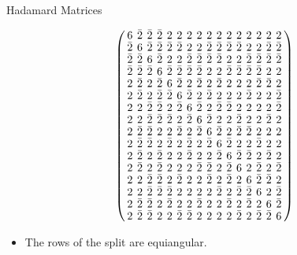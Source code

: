 \documentclass{beamer}
\begin{document}
\begin{frame}{Hadamard Matrices}

  \[
    \arraycolsep=2.0pt\def\arraystretch{0.75}
    \left(
      \begin{array}{cccccccccccccccc}
        6&\bar{2}&\bar{2}&\bar{2}&2&2&2&2&2&2&2&2&2&2&2&2\\
        \bar{2}&6&\bar{2}&\bar{2}&\bar{2}&\bar{2}&2&2&\bar{2}&\bar{2}&\bar{2}&\bar{2}&2&2&\bar{2}&\bar{2}\\
        \bar{2}&\bar{2}&6&\bar{2}&2&2&\bar{2}&\bar{2}&\bar{2}&\bar{2}&2&2&\bar{2}&\bar{2}&\bar{2}&\bar{2}\\
        \bar{2}&\bar{2}&\bar{2}&6&\bar{2}&\bar{2}&\bar{2}&\bar{2}&2&2&\bar{2}&\bar{2}&\bar{2}&\bar{2}&2&2\\
        2&\bar{2}&2&\bar{2}&6&\bar{2}&2&\bar{2}&2&\bar{2}&2&2&2&\bar{2}&\bar{2}&2\\
        2&\bar{2}&2&\bar{2}&\bar{2}&6&\bar{2}&2&\bar{2}&2&2&2&\bar{2}&2&2&\bar{2}\\
        2&2&\bar{2}&\bar{2}&2&\bar{2}&6&\bar{2}&2&\bar{2}&\bar{2}&2&2&2&2&\bar{2}\\
        2&2&\bar{2}&\bar{2}&\bar{2}&2&\bar{2}&6&\bar{2}&2&2&\bar{2}&2&2&\bar{2}&2\\
        2&\bar{2}&\bar{2}&2&2&\bar{2}&2&\bar{2}&6&\bar{2}&2&\bar{2}&\bar{2}&2&2&2\\
        2&\bar{2}&\bar{2}&2&\bar{2}&2&\bar{2}&2&\bar{2}&6&\bar{2}&2&2&\bar{2}&2&2\\
        2&\bar{2}&2&\bar{2}&2&2&\bar{2}&2&2&\bar{2}&6&\bar{2}&\bar{2}&2&\bar{2}&2\\
        2&\bar{2}&2&\bar{2}&2&2&2&\bar{2}&\bar{2}&2&\bar{2}&6&2&\bar{2}&2&\bar{2}\\
        2&2&\bar{2}&\bar{2}&2&\bar{2}&2&2&\bar{2}&2&\bar{2}&2&6&\bar{2}&\bar{2}&2\\
        2&2&\bar{2}&\bar{2}&\bar{2}&2&2&2&2&\bar{2}&2&\bar{2}&\bar{2}&6&2&\bar{2}\\
        2&\bar{2}&\bar{2}&2&\bar{2}&2&2&\bar{2}&2&2&\bar{2}&2&\bar{2}&2&6&\bar{2}\\
        2&\bar{2}&\bar{2}&2&2&\bar{2}&\bar{2}&2&2&2&2&\bar{2}&2&\bar{2}&\bar{2}&6\\
      \end{array}
    \right)
  \]

  \begin{itemize}
    \item The rows of the split are equiangular.
  \end{itemize}
  
\end{frame}
\end{document}
